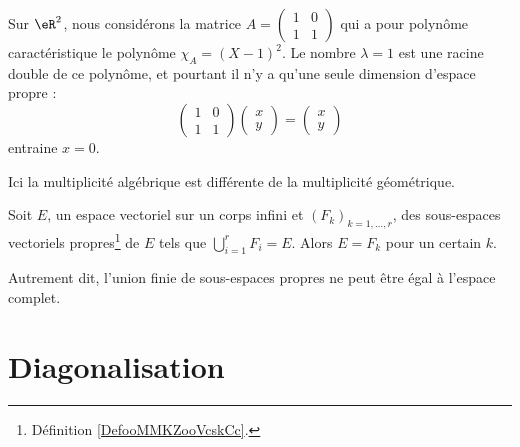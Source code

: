 \begin{example} \label{ExICOJcFp}
    Sur \( \eR^2\), nous considérons la matrice \( A=\begin{pmatrix}
        1    &   0    \\ 
        1    &   1    
    \end{pmatrix}\) qui a pour polynôme caractéristique le polynôme \( \chi_A=(X-1)^2\). Le nombre \( \lambda=1\) est une racine double de ce polynôme, et pourtant il n'y a qu'une seule dimension d'espace propre :
    \begin{equation}
        \begin{pmatrix}
            1    &   0    \\ 
            1    &   1    
        \end{pmatrix}\begin{pmatrix}
            x    \\ 
            y    
        \end{pmatrix}=\begin{pmatrix}
            x    \\ 
            y    
        \end{pmatrix}
    \end{equation}
    entraine \( x=0\).

    Ici la multiplicité algébrique est différente de la multiplicité géométrique.
\end{example}

\begin{proposition}   \label{PropTVKbxU}
    Soit \( E\), un espace vectoriel sur un corps infini et \( (F_k)_{k=1,\ldots, r}\), des sous-espaces vectoriels propres\footnote{Définition \ref{DefooMMKZooVcskCc}.} de \( E\) tels que \( \bigcup_{i=1}^rF_i=E\). Alors \( E=F_k\) pour un certain \( k\).

    Autrement dit, l'union finie de sous-espaces propres ne peut être égal à l'espace complet.
\end{proposition}


\section{Diagonalisation}

